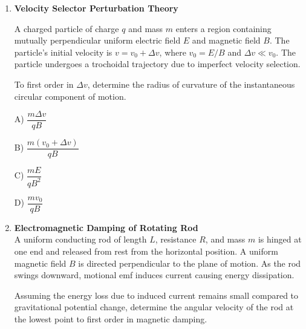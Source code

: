 \documentclass[12pt]{article}
\begin{document}
\begin{enumerate}
A) $\dfrac{m}{M+m}\sqrt{\dfrac{kx^2}{m}}$

B) $\dfrac{m}{M+m}\sqrt{\dfrac{2kx^2}{m}}$

C) $\dfrac{m\cos\theta}{M+m}\sqrt{\dfrac{2kx^2}{m}}$

D) $\dfrac{m}{M}\sqrt{\dfrac{2kx^2}{m}}$

\item \textbf{Velocity Selector Perturbation Theory}

A charged particle of charge $q$ and mass $m$ enters a region containing mutually perpendicular uniform electric field $E$ and magnetic field $B$. The particle’s initial velocity is $v = v_0 + \Delta v$, where $v_0 = E/B$ and $\Delta v \ll v_0$. The particle undergoes a trochoidal trajectory due to imperfect velocity selection.

To first order in $\Delta v$, determine the radius of curvature of the instantaneous circular component of motion.

A) $\dfrac{m\Delta v}{qB}$

B) $\dfrac{m(v_0+\Delta v)}{qB}$

C) $\dfrac{mE}{qB^2}$

D) $\dfrac{mv_0}{qB}$

\item \textbf{Electromagnetic Damping of Rotating Rod} \\ 


A uniform conducting rod of length $L$, resistance $R$, and mass $m$ is hinged at one end and released from rest from the horizontal position. A uniform magnetic field $B$ is directed perpendicular to the plane of motion. As the rod swings downward, motional emf induces current causing energy dissipation.

Assuming the energy loss due to induced current remains small compared to gravitational potential change, determine the angular velocity of the rod at the lowest point to first order in magnetic damping.

\begin{center}
\end{center}
\end{enumerate}
\end{document}
